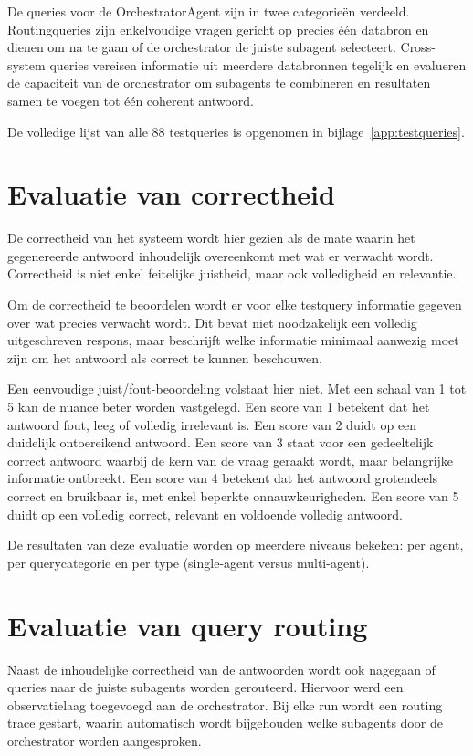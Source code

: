 De queries voor de OrchestratorAgent zijn in twee categorieën verdeeld. Routingqueries zijn enkelvoudige vragen gericht op precies één databron en dienen om na te gaan of de orchestrator de juiste subagent selecteert. Cross-system queries vereisen informatie uit meerdere databronnen tegelijk en evalueren de capaciteit van de orchestrator om subagents te combineren en resultaten samen te voegen tot één coherent antwoord.

De volledige lijst van alle 88 testqueries is opgenomen in bijlage~\ref{app:testqueries}.

\section{Evaluatie van correctheid}
\label{sec:evaluatie-correctheid-methode}

De correctheid van het systeem wordt hier gezien als de mate waarin het gegenereerde antwoord inhoudelijk overeenkomt met wat er verwacht wordt. Correctheid is niet enkel feitelijke juistheid, maar ook volledigheid en relevantie.

Om de correctheid te beoordelen wordt er voor elke testquery informatie gegeven over wat precies verwacht wordt. Dit bevat niet noodzakelijk een volledig uitgeschreven respons, maar beschrijft welke informatie minimaal aanwezig moet zijn om het antwoord als correct te kunnen beschouwen.

Een eenvoudige juist/fout-beoordeling volstaat hier niet. Met een schaal van 1 tot 5 kan de nuance beter worden vastgelegd. Een score van 1 betekent dat het antwoord fout, leeg of volledig irrelevant is. Een score van 2 duidt op een duidelijk ontoereikend antwoord. Een score van 3 staat voor een gedeeltelijk correct antwoord waarbij de kern van de vraag geraakt wordt, maar belangrijke informatie ontbreekt. Een score van 4 betekent dat het antwoord grotendeels correct en bruikbaar is, met enkel beperkte onnauwkeurigheden. Een score van 5 duidt op een volledig correct, relevant en voldoende volledig antwoord.

De resultaten van deze evaluatie worden op meerdere niveaus bekeken: per agent, per querycategorie en per type (single-agent versus multi-agent).

\section{Evaluatie van query routing}
\label{sec:evaluatie-routing-methode}

Naast de inhoudelijke correctheid van de antwoorden wordt ook nagegaan of queries naar de juiste subagents worden gerouteerd. Hiervoor werd een observatielaag toegevoegd aan de orchestrator. Bij elke run wordt een routing trace gestart, waarin automatisch wordt bijgehouden welke subagents door de orchestrator worden aangesproken.


